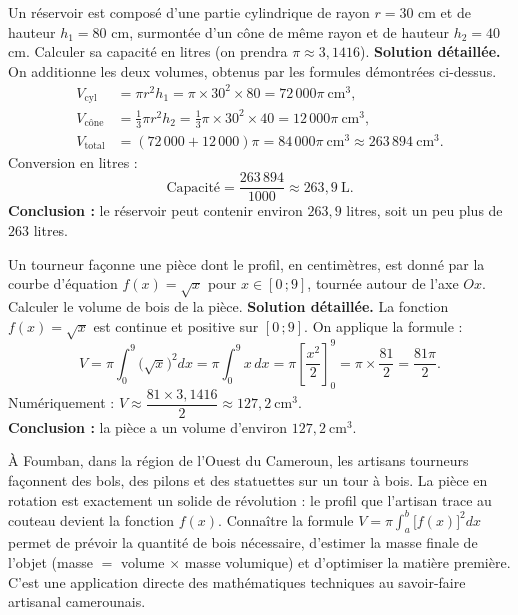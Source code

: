 \documentclass[11pt]{article}
\begin{document}
\begin{exoresolu}
Un réservoir est composé d'une partie cylindrique de rayon $r=30$ cm et de hauteur $h_1=80$ cm, surmontée d'un cône de même rayon et de hauteur $h_2=40$ cm. Calculer sa capacité en litres (on prendra $\pi \approx 3,1416$).
\tcblower
\textbf{Solution détaillée.} On additionne les deux volumes, obtenus par les formules démontrées ci-dessus.
\begin{align*}
V_{\text{cyl}} &= \pi r^2 h_1 = \pi \times 30^2 \times 80 = 72\,000\pi\ \text{cm}^3,\\
V_{\text{cône}} &= \frac{1}{3}\pi r^2 h_2 = \frac{1}{3}\pi \times 30^2 \times 40 = 12\,000\pi\ \text{cm}^3,\\
V_{\text{total}} &= (72\,000+12\,000)\pi = 84\,000\pi\ \text{cm}^3 \approx 263\,894\ \text{cm}^3.
\end{align*}
Conversion en litres :
\[
\text{Capacité} = \frac{263\,894}{1000} \approx 263,9\ \text{L}.
\]
\textbf{Conclusion :} le réservoir peut contenir environ $263,9$ litres, soit un peu plus de $263$ litres.
\end{exoresolu}

\begin{exoresolu}
Un tourneur façonne une pièce dont le profil, en centimètres, est donné par la courbe d'équation $f(x)=\sqrt{x}$ pour $x\in[0\,;9]$, tournée autour de l'axe $Ox$. Calculer le volume de bois de la pièce.
\tcblower
\textbf{Solution détaillée.} La fonction $f(x)=\sqrt{x}$ est continue et positive sur $[0\,;9]$. On applique la formule :
\[
V = \pi \int_0^9 \bigl(\sqrt{x}\bigr)^2 dx = \pi \int_0^9 x\,dx = \pi \left[\frac{x^2}{2}\right]_0^9 = \pi \times \frac{81}{2} = \frac{81\pi}{2}.
\]
Numériquement : $V \approx \dfrac{81 \times 3,1416}{2} \approx 127,2\ \text{cm}^3$.\\
\textbf{Conclusion :} la pièce a un volume d'environ $127,2\ \text{cm}^3$.
\end{exoresolu}

\begin{savaistu}
À Foumban, dans la région de l'Ouest du Cameroun, les artisans tourneurs façonnent des bols, des pilons et des statuettes sur un tour à bois. La pièce en rotation est exactement un solide de révolution : le profil que l'artisan trace au couteau devient la fonction $f(x)$. Connaître la formule $V = \pi\displaystyle\int_a^b \bigl[f(x)\bigr]^2 dx$ permet de prévoir la quantité de bois nécessaire, d'estimer la masse finale de l'objet (masse $=$ volume $\times$ masse volumique) et d'optimiser la matière première. C'est une application directe des mathématiques techniques au savoir-faire artisanal camerounais.
\end{savaistu}
\end{document}
